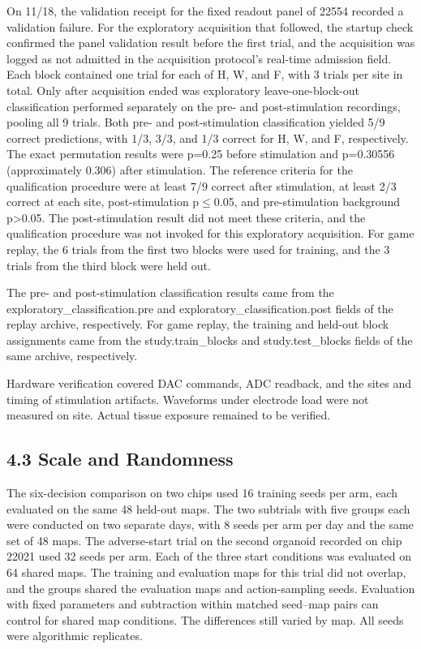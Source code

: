 \documentclass{article}
\begin{document}
On 11/18, the validation receipt for the fixed readout panel of 22554 recorded a validation failure. For the exploratory acquisition that followed, the startup check confirmed the panel validation result before the first trial, and the acquisition was logged as not admitted in the acquisition protocol's real-time admission field. Each block contained one trial for each of H, W, and F, with 3 trials per site in total. Only after acquisition ended was exploratory leave-one-block-out classification performed separately on the pre- and post-stimulation recordings, pooling all 9 trials. Both pre- and post-stimulation classification yielded 5/9 correct predictions, with 1/3, 3/3, and 1/3 correct for H, W, and F, respectively. The exact permutation results were p=0.25 before stimulation and p=0.30556 (approximately 0.306) after stimulation. The reference criteria for the qualification procedure were at least 7/9 correct after stimulation, at least 2/3 correct at each site, post-stimulation p\ensuremath{\leq}0.05, and pre-stimulation background p>0.05. The post-stimulation result did not meet these criteria, and the qualification procedure was not invoked for this exploratory acquisition. For game replay, the 6 trials from the first two blocks were used for training, and the 3 trials from the third block were held out.


The pre- and post-stimulation classification results came from the exploratory\_\allowbreak{}classification.pre and exploratory\_\allowbreak{}classification.post fields of the replay archive, respectively. For game replay, the training and held-out block assignments came from the study.train\_\allowbreak{}blocks and study.test\_\allowbreak{}blocks fields of the same archive, respectively.


Hardware verification covered DAC commands, ADC readback, and the sites and timing of stimulation artifacts. Waveforms under electrode load were not measured on site. Actual tissue exposure remained to be verified.


\subsection*{4.3 Scale and Randomness}


The six-decision comparison on two chips used 16 training seeds per arm, each evaluated on the same 48 held-out maps. The two subtrials with five groups each were conducted on two separate days, with 8 seeds per arm per day and the same set of 48 maps. The adverse-start trial on the second organoid recorded on chip 22021 used 32 seeds per arm. Each of the three start conditions was evaluated on 64 shared maps. The training and evaluation maps for this trial did not overlap, and the groups shared the evaluation maps and action-sampling seeds. Evaluation with fixed parameters and subtraction within matched seed--map pairs can control for shared map conditions. The differences still varied by map. All seeds were algorithmic replicates.
\end{document}
